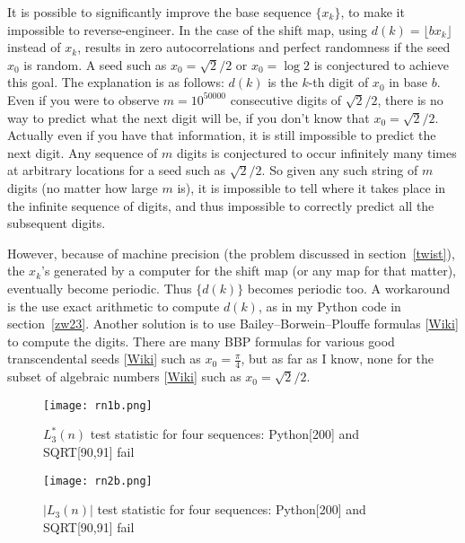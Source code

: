 \documentclass[oneside,10pt]{book}
\begin{document}
It is possible to significantly improve the base sequence $\{x_k\}$, to make it impossible to reverse-engineer. In the case of the shift map, using $d(k)=\lfloor bx_k\rfloor$ instead of $x_k$, results in zero autocorrelations and perfect randomness if the seed $x_0$ is random. A seed such as $x_0=\sqrt{2}/2$ or $x_0=\log 2$ 
is conjectured to achieve this goal. The explanation is as follows: $d(k)$ is the $k$-th digit of $x_0$ in base $b$. Even if you were to observe $m=10^{\num{50000}}$ consecutive digits of $\sqrt{2}/2$, there is no way to predict what the next digit will be, if you don't know that $x_0=\sqrt{2}/2$. Actually even if you have that information, it is still impossible to predict the next digit. Any sequence of $m$ digits is conjectured to occur infinitely many times at arbitrary locations for a seed such as $\sqrt{2}/2$. So given any such string of $m$ digits (no matter how large $m$ is), it is impossible to tell where it takes place in the infinite sequence of digits, and thus impossible to correctly predict all the subsequent digits.    

However, because of machine precision (the problem discussed in section~\ref{twist}), the $x_k$'s generated by a computer for the shift map (or any map for that matter), eventually become periodic. Thus $\{d(k)\}$ becomes periodic too. A workaround is the use exact arithmetic to compute $d(k)$, as in my Python code in section~\ref{zw23}. Another solution is to use 
 \textcolor{index}{Bailey–Borwein–Plouffe formulas} [\href{https://en.wikipedia.org/wiki/Bailey\%E2\%80\%93Borwein\%E2\%80\%93Plouffe_formula}{Wiki}]
 to compute the digits. There are many BBP formulas for various good \textcolor{index}{transcendental} seeds [\href{https://en.wikipedia.org/wiki/Transcendental_number}{Wiki}]  
  such as $x_0=\frac{\pi}{4}$, but as far as I know, none for
  the subset of \textcolor{index}{algebraic numbers} [\href{https://en.wikipedia.org/wiki/Algebraic_number}{Wiki}] such as $x_0=\sqrt{2}/2$. 

\begin{figure}%
\centering
\texttt{[image: rn1b.png]}  
\caption{$L_3^*(n)$ test statistic for four sequences: Python[200] and SQRT[90,91] fail}
\label{fig:rn1}
\end{figure}

\begin{figure}%
\centering
\texttt{[image: rn2b.png]}  
\caption{$|L_3(n)|$  test statistic for four sequences: Python[200] and SQRT[90,91] fail}
\label{fig:rn2}
\end{figure}
\end{document}
